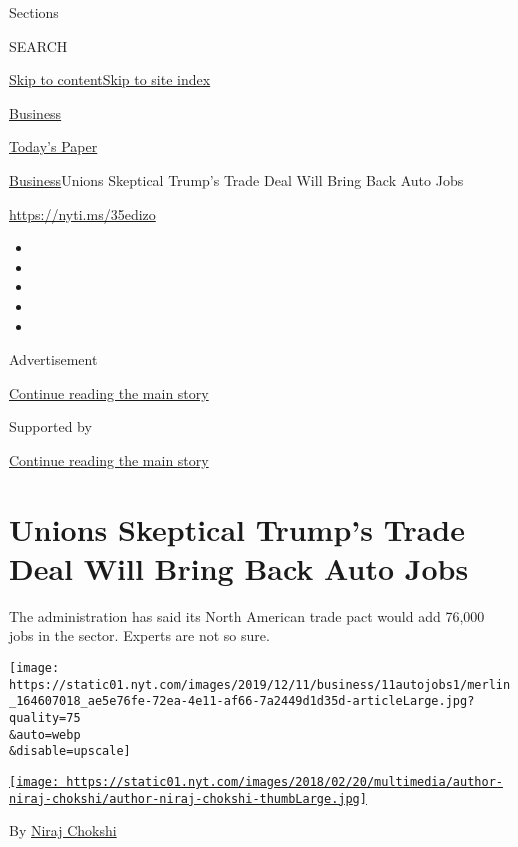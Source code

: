 Sections

SEARCH

\protect\hyperlink{site-content}{Skip to
content}\protect\hyperlink{site-index}{Skip to site index}

\href{https://www.nytimes.com/section/business}{Business}

\href{https://myaccount.nytimes.com/auth/login?response_type=cookie\&client_id=vi}{}

\href{https://www.nytimes.com/section/todayspaper}{Today's Paper}

\href{/section/business}{Business}\textbar{}Unions Skeptical Trump's
Trade Deal Will Bring Back Auto Jobs

\url{https://nyti.ms/35edizo}

\begin{itemize}
\item
\item
\item
\item
\item
\end{itemize}

Advertisement

\protect\hyperlink{after-top}{Continue reading the main story}

Supported by

\protect\hyperlink{after-sponsor}{Continue reading the main story}

\hypertarget{unions-skeptical-trumps-trade-deal-will-bring-back-auto-jobs}{%
\section{Unions Skeptical Trump's Trade Deal Will Bring Back Auto
Jobs}\label{unions-skeptical-trumps-trade-deal-will-bring-back-auto-jobs}}

The administration has said its North American trade pact would add
76,000 jobs in the sector. Experts are not so sure.

\texttt{[image: https://static01.nyt.com/images/2019/12/11/business/11autojobs1/merlin\_164607018\_ae5e76fe-72ea-4e11-af66-7a2449d1d35d-articleLarge.jpg?quality=75\\\&auto=webp\\\&disable=upscale]}

\href{https://www.nytimes.com/by/niraj-chokshi}{\texttt{[image: https://static01.nyt.com/images/2018/02/20/multimedia/author-niraj-chokshi/author-niraj-chokshi-thumbLarge.jpg]}}

By \href{https://www.nytimes.com/by/niraj-chokshi}{Niraj Chokshi}

